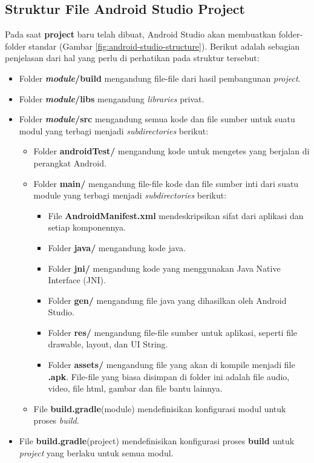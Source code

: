 \subsection{Struktur File Android Studio Project}
Pada saat \textbf{project} baru telah dibuat, Android Studio akan membuatkan folder-folder standar (Gambar \ref{fig:android-studio-structure}). Berikut adalah sebagian penjelasan dari hal yang perlu di perhatikan pada struktur tersebut:
\begin{itemize}
	\item Folder \textbf{\textit{module}/build} mengandung file-file dari hasil pembangunan \textit{project}.
	\item Folder \textbf{\textit{module}/libs} mengandung \textit{libraries} privat.
	\item Folder \textbf{\textit{module}/src} mengandung semua kode dan file sumber untuk suatu modul yang terbagi menjadi \textit{subdirectories} berikut:
	\begin{itemize}
		\item Folder \textbf{androidTest/} mengandung kode untuk mengetes yang berjalan di perangkat Android. 
		\item Folder \textbf{main/} mengandung file-file kode dan file sumber inti dari suatu module yang terbagi menjadi \textit{subdirectories} berikut:
		\begin{itemize}
			\item File \textbf{AndroidManifest.xml} mendeskripsikan sifat dari aplikasi dan setiap komponennya. 
			\item Folder \textbf{java/} mengandung kode java.
			\item Folder \textbf{jni/} mengandung kode yang menggunakan Java Native Interface (JNI).
			\item Folder \textbf{gen/} mengandung file java yang dihasilkan oleh Android Studio.
			\item Folder \textbf{res/} mengandung file-file sumber untuk aplikasi, seperti file drawable, layout, dan UI String.
			\item Folder \textbf{assets/} mengandung file yang akan di kompile menjadi file \textbf{.apk}. File-file yang biasa disimpan di folder ini adalah file audio, video, file html, gambar dan file bantu lainnya.
		\end{itemize}
		\item File \textbf{build.gradle}(module) mendefinisikan konfigurasi modul untuk proses \textit{build}.
	\end{itemize}
	\item File \textbf{build.gradle}(project) mendefinisikan konfigurasi proses \textbf{build} untuk \textit{project} yang berlaku untuk semua modul.
\end{itemize}
